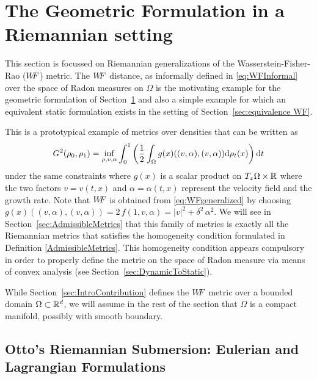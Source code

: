 
\section{The Geometric Formulation in a Riemannian setting}
\label{sec:geometry}

This section is focussed on Riemannian generalizations of the Wasserstein-Fisher-Rao ($W\! \! F$) metric. The $W\! \! F$ distance, as informally defined in \eqref{eq:WFInformal} over the space of Radon measures on $\Omega$ is the motivating example for the geometric formulation of Section~\ref{sec:geometry} and also a simple example for which an equivalent static formulation exists in the setting of Section~\ref{sec:equivalence WF}.

%

This is a prototypical example of metrics over densities that can be written as
\begin{equation}\label{eq:WFgeneralized}
G^2(\rho_0,\rho_1) = \inf_{\rho,v, \alpha} \int_0^1 \left( \frac12 \int_\Omega  g(x)((v,\alpha),(v,\alpha)) \mathrm{d} \rho_t(x) \right) \mathrm{d} t 
\end{equation}
under the same constraints where $g(x)$ is a scalar product on $T_x\Omega \times \mathbb{R}$ where the two factors $v= v(t,x)$ and $\alpha = \alpha(t,x)$ represent the velocity field and the growth rate.
Note that $W\! \! F$ is obtained from \eqref{eq:WFgeneralized} by choosing $g(x)((v,\alpha),(v,\alpha)) = 2\,f(1,v,\alpha)=|v|^2 + \delta^2\,\alpha^2$. We will see in Section~\ref{sec:AdmissibleMetrics} that this family of metrics is exactly all the Riemannian metrics that satisfies the homogeneity condition formulated in Definition \ref{AdmissibleMetrics}. This homogeneity condition appears compulsory in order to properly define the metric on the space of Radon measure via means of convex analysis (see Section~\ref{sec:DynamicToStatic}).


While Section~\ref{sec:IntroContribution} defines the $W\! \! F$ metric over a bounded domain $\Omega \subset \mathbb{R}^d$, we will assume in the rest of the section that $\Omega$ is a compact manifold, possibly with smooth boundary.

\subsection{Otto's Riemannian Submersion: Eulerian and Lagrangian Formulations}\label{sec-submersion}

